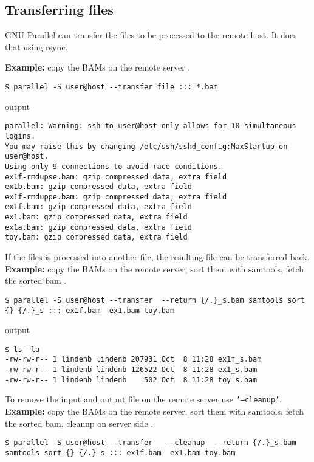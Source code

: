 \documentclass{article}
\newcommand{\example}[1]{
\textbf{Example: } {\color[rgb]{0,0,1} #1 } .
}
\newcommand{\cmdoption}[1]{\texttt{'#1'}}
\begin{document}

\subsection{Transferring files}
GNU Parallel can transfer the files to be processed to the remote host. It does that using rsync.
\example{copy the BAMs on the remote server}
\begin{lstlisting}
$ parallel -S user@host --transfer file ::: *.bam
\end{lstlisting}
output
\begin{lstlisting}
parallel: Warning: ssh to user@host only allows for 10 simultaneous logins.
You may raise this by changing /etc/ssh/sshd_config:MaxStartup on user@host.
Using only 9 connections to avoid race conditions.
ex1f-rmdupse.bam: gzip compressed data, extra field
ex1b.bam: gzip compressed data, extra field
ex1f-rmduppe.bam: gzip compressed data, extra field
ex1f.bam: gzip compressed data, extra field
ex1.bam: gzip compressed data, extra field
ex1a.bam: gzip compressed data, extra field
toy.bam: gzip compressed data, extra field
\end{lstlisting}

If the files is processed into another file, the resulting file can be transferred back.\\
\example{copy the BAMs on the remote server, sort them with samtools, fetch the sorted bam}
\begin{lstlisting}
$ parallel -S user@host --transfer  --return {/.}_s.bam samtools sort {} {/.}_s ::: ex1f.bam  ex1.bam toy.bam
\end{lstlisting}
output
\begin{lstlisting}
$ ls -la
-rw-rw-r-- 1 lindenb lindenb 207931 Oct  8 11:28 ex1f_s.bam
-rw-rw-r-- 1 lindenb lindenb 126522 Oct  8 11:28 ex1_s.bam
-rw-rw-r-- 1 lindenb lindenb    502 Oct  8 11:28 toy_s.bam
\end{lstlisting}
To remove the input and output file on the remote server use \cmdoption{--cleanup}.\\
\example{copy the BAMs on the remote server, sort them with samtools, fetch the sorted bam, cleanup on server side}
\begin{lstlisting}
$ parallel -S user@host --transfer   --cleanup  --return {/.}_s.bam samtools sort {} {/.}_s ::: ex1f.bam  ex1.bam toy.bam
\end{lstlisting}
\end{document}
